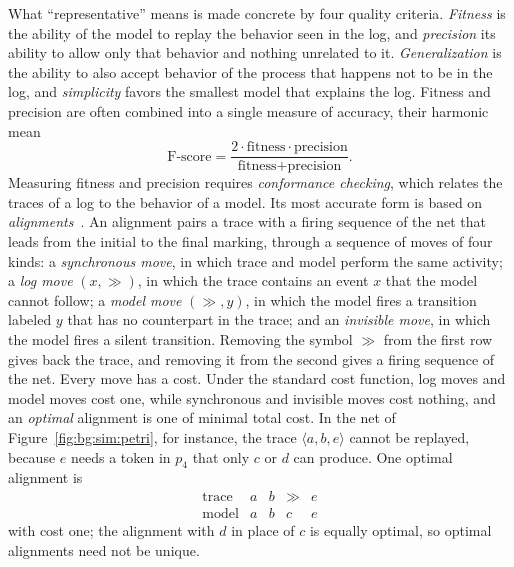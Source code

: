     What ``representative'' means is made concrete by four quality
    criteria. \emph{Fitness} is the
    ability of the model to replay the behavior seen in the log, and
    \emph{precision} its ability to allow only that behavior and nothing
    unrelated to it. \emph{Generalization} is the ability to also accept behavior
    of the process that happens not to be in the log, and \emph{simplicity}
    favors the smallest model that explains the log. Fitness and precision are
    often combined into a single measure of accuracy, their harmonic
    mean~\cite{augusto2019splitminer}
    \begin{equation}
    \text{F-score} = \frac{2 \cdot \text{fitness} \cdot \text{precision}}
                          {\text{fitness} + \text{precision}}.
    \label{eq:bg:sim:fscore}
    \end{equation}
    Measuring fitness and precision requires \emph{conformance checking}, which
    relates the traces of a log to the behavior of a model. Its most accurate form
    is based on \emph{alignments}~\cite{vanderaalst2016,carmona2022conformance}.
    An alignment pairs a trace with a firing sequence of the net that leads from
    the initial to the final marking, through a sequence of moves of four kinds:
    a \emph{synchronous move}, in which trace and model perform the same activity;
    a \emph{log move} $(x, \gg)$, in which the trace contains an event $x$ that the
    model cannot follow; a \emph{model move} $(\gg, y)$, in which the model fires
    a transition labeled $y$ that has no counterpart in the trace; and an
    \emph{invisible move}, in which the model fires a silent transition. Removing
    the symbol $\gg$ from the first row gives back the trace, and removing it from
    the second gives a firing sequence of the net. Every
    move has a cost. Under the standard cost function, log moves and model moves
    cost one, while synchronous and invisible moves cost nothing, and an
    \emph{optimal} alignment is one of minimal total cost. In the net of
    Figure~\ref{fig:bg:sim:petri}, for instance, the trace $\langle a, b, e
    \rangle$ cannot be replayed, because $e$ needs a token in $p_4$ that only $c$
    or $d$ can produce. One optimal alignment is
    \begin{equation*}
    \begin{array}{c|cccc}
    \text{trace} & a & b & \gg & e \\
    \text{model} & a & b & c   & e
    \end{array}
    \end{equation*}
    with cost one; the alignment with $d$ in place of $c$ is equally optimal, so
    optimal alignments need not be unique.
    

